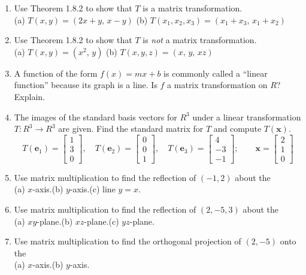 \documentclass{article}
\theoremstyle{mystyle}
\begin{document}
\begin{enumerate}
\item[21.] Use Theorem 1.8.2 to show that $T$ is a matrix transformation.\\
(a) $T(x,y)=(2x+y,\,x-y)$\quad
(b) $T(x_1,x_2,x_3)=(x_1+x_3,\,x_1+x_2)$

\item[23.] Use Theorem 1.8.2 to show that $T$ is \emph{not} a matrix transformation.\\
(a) $T(x,y)=(x^2,\,y)$\quad
(b) $T(x,y,z)=(x,\,y,\,xz)$

\item[25.] A function of the form $f(x)=mx+b$ is commonly called a ``linear function'' because its graph is a line. Is $f$ a matrix transformation on $R$? Explain.

\item[27.] The images of the standard basis vectors for $R^3$ under a linear transformation $T:R^3\to R^3$ are given. Find the standard matrix for $T$ and compute $T(\mathbf{x})$.
\[
T(\mathbf{e}_1)=\begin{bmatrix}1\\3\\0\end{bmatrix},\quad
T(\mathbf{e}_2)=\begin{bmatrix}0\\0\\1\end{bmatrix},\quad
T(\mathbf{e}_3)=\begin{bmatrix}4\\-3\\-1\end{bmatrix};\qquad
\mathbf{x}=\begin{bmatrix}2\\1\\0\end{bmatrix}
\]

\item[29.] Use matrix multiplication to find the reflection of $(-1,2)$ about the\\
(a) $x$-axis.\quad (b) $y$-axis.\quad (c) line $y=x$.

\item[31.] Use matrix multiplication to find the reflection of $(2,-5,3)$ about the\\
(a) $xy$-plane.\quad (b) $xz$-plane.\quad (c) $yz$-plane.

\item[33.] Use matrix multiplication to find the orthogonal projection of $(2,-5)$ onto the\\
(a) $x$-axis.\quad (b) $y$-axis.


\end{enumerate}
\end{document}
